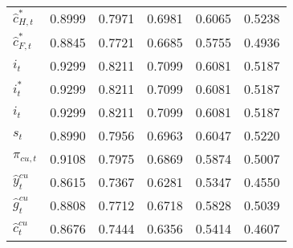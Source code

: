 \begin{center}
\begin{longtable}{lccccc}
${\hat c_{H,t}^*}         $	 & 	    0.8999	 & 	    0.7971	 & 	    0.6981	 & 	    0.6065	 & 	    0.5238 \\ 
${\hat c_{F,t}^*}         $	 & 	    0.8845	 & 	    0.7721	 & 	    0.6685	 & 	    0.5755	 & 	    0.4936 \\ 
${i_t}                    $	 & 	    0.9299	 & 	    0.8211	 & 	    0.7099	 & 	    0.6081	 & 	    0.5187 \\ 
${i_t^*}                  $	 & 	    0.9299	 & 	    0.8211	 & 	    0.7099	 & 	    0.6081	 & 	    0.5187 \\ 
${i_t}                    $	 & 	    0.9299	 & 	    0.8211	 & 	    0.7099	 & 	    0.6081	 & 	    0.5187 \\ 
${s_t}                    $	 & 	    0.8990	 & 	    0.7956	 & 	    0.6963	 & 	    0.6047	 & 	    0.5220 \\ 
${\pi_{cu,t}}             $	 & 	    0.9108	 & 	    0.7975	 & 	    0.6869	 & 	    0.5874	 & 	    0.5007 \\ 
${\hat y_t^{cu}}          $	 & 	    0.8615	 & 	    0.7367	 & 	    0.6281	 & 	    0.5347	 & 	    0.4550 \\ 
${\hat g_t^{cu}}          $	 & 	    0.8808	 & 	    0.7712	 & 	    0.6718	 & 	    0.5828	 & 	    0.5039 \\ 
${\hat c_t^{cu}}          $	 & 	    0.8676	 & 	    0.7444	 & 	    0.6356	 & 	    0.5414	 & 	    0.4607 \\ 
\end{longtable}
 \end{center}
